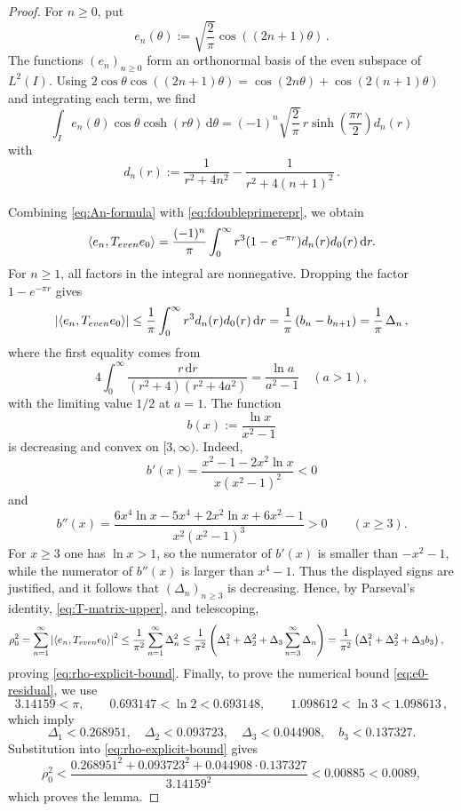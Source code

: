 \documentclass[10pt,a4paper]{amsart}
\newcommand{\ip}[2]{\left\langle #1,#2\right\rangle}
\newcommand{\abs}[1]{\left\lvert #1\right\rvert}
\newcommand{\dd}{\,\mathrm{d}}
\begin{document}
\begin{proof}
For $n\geq0$, put
\begin{equation}\label{eq:en-def}
e_n(\theta):=\sqrt{\frac2\pi}\cos((2n+1)\theta) \,.
\end{equation}
The functions $(e_n)_{n\geq0}$ form an orthonormal basis of the even
subspace of $L^2(I)$. Using
$2\cos\theta\cos((2n+1)\theta)
=\cos(2n\theta)+\cos(2(n+1)\theta)$ and integrating each term, we find
\begin{equation}\label{eq:An-formula}
\int_I e_n(\theta)\cos\theta\cosh(r\theta)\dd\theta
=(-1)^n\sqrt{\frac2\pi}\,
 r\sinh\left(\frac{\pi r}{2}\right)d_n(r)
\end{equation}
with
\begin{equation}\label{eq:dn-def}
d_n(r):=\frac{1}{r^2+4n^2}
-\frac{1}{r^2+4(n+1)^2} \,.
\end{equation}

Combining \eqref{eq:An-formula} with
\eqref{eq:fdoubleprimerepr},%
we obtain
\begin{equation}\label{eq:T-matrix-e0}
\ip{e_n}{T_{\rm even}e_0}
=\frac{(-1)^n}{\pi}\int_0^\infty
r^3(1-e^{-\pi r})d_n(r)d_0(r)\dd r.
\end{equation}
For $n\geq1$, all factors in the integral
are nonnegative.  Dropping the factor $1-e^{-\pi r}$ gives
\begin{equation}\label{eq:T-matrix-upper}
\abs{\ip{e_n}{T_{\rm even}e_0}}
\leq\frac1\pi\int_0^\infty r^3d_n(r)d_0(r)\dd r = \frac1\pi \left( b_n-b_{n+1}\right) = \frac1\pi\,\Delta_n \,,
\end{equation}
where the first equality comes from
\[
4\int_0^\infty
\frac{r\dd r}{(r^2+4)(r^2+4a^2)}
=\frac{\ln a}{a^2-1}\quad(a>1),
\]
with the limiting value $1/2$ at $a=1$.
The function
\[
b(x):=\frac{\ln x}{x^2-1}
\]
is decreasing and convex on $[3,\infty)$.  Indeed,
\[
b'(x)=\frac{x^2-1-2x^2\ln x}{x(x^2-1)^2}<0
\]
and
\[
b''(x)=
\frac{6x^4\ln x-5x^4+2x^2\ln x+6x^2-1}
{x^2(x^2-1)^3}>0
\qquad(x\geq3).
\]
For $x\geq3$ one has $\ln x>1$, so the numerator of $b'(x)$
is smaller than $-x^2-1$, while the numerator of $b''(x)$ is larger
than $x^4-1$.  Thus the displayed signs are justified, and it follows
that $(\Delta_n)_{n\geq3}$ is decreasing.  Hence, by
Parseval's identity, \eqref{eq:T-matrix-upper}, and telescoping,
\begin{align*}
\rho_0^2
&=\sum_{n=1}^\infty
\abs{\ip{e_n}{T_{\rm even}e_0}}^2\notag
\leq\frac1{\pi^2}\sum_{n=1}^\infty\Delta_n^2\notag
\leq\frac1{\pi^2}
\left(\Delta_1^2+\Delta_2^2
+\Delta_3\sum_{n=3}^\infty\Delta_n\right)\notag
=\frac1{\pi^2}
\left(\Delta_1^2+\Delta_2^2+\Delta_3b_3\right),
\end{align*}
proving \eqref{eq:rho-explicit-bound}.
Finally, to prove the numerical bound \eqref{eq:e0-residual}, we use
\[
3.14159<\pi,
\qquad
0.693147<\ln2<0.693148,
\qquad
1.098612<\ln3<1.098613 \,,
\]
which imply
\[
\Delta_1<0.268951,
\quad
\Delta_2<0.093723,
\quad
\Delta_3<0.044908,
\quad
b_3<0.137327.
\]
Substitution into \eqref{eq:rho-explicit-bound} gives
\[
\rho_0^2
<\frac{0.268951^2+0.093723^2+0.044908\cdot0.137327}
{3.14159^2}
<0.00885<0.0089,
\]
which proves the lemma.
\end{proof}
\end{document}
